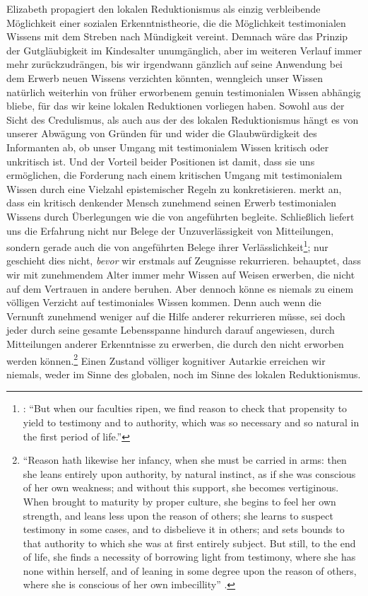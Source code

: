 Elizabeth  propagiert den lokalen Reduktionismus als einzig
verbleibende Möglichkeit einer sozialen Erkenntnistheorie, die die Möglichkeit
testimonialen Wissens mit dem Streben nach Mündigkeit vereint. Demnach wäre das
Prinzip der Gutgläubigkeit im Kindesalter unumgänglich, aber im weiteren Verlauf
immer mehr zurückzudrängen, bis wir irgendwann gänzlich auf seine Anwendung bei
dem Erwerb neuen Wissens verzichten könnten, wenngleich unser Wissen natürlich
weiterhin von früher erworbenem genuin testimonialen Wissen abhängig bliebe, für
das wir keine lokalen Reduktionen vorliegen haben. Sowohl aus der Sicht des
Credulismus, als auch aus der des lokalen Reduktionismus hängt es von unserer
Abwägung von Gründen für und wider die Glaubwürdigkeit des Informanten ab, ob
unser Umgang mit testimonialem Wissen kritisch oder unkritisch ist. Und der
Vorteil beider Positionen ist damit, dass sie uns ermöglichen, die Forderung
nach einem kritischen Umgang mit testimonialem Wissen durch eine Vielzahl
epistemischer Regeln zu konkretisieren.
 merkt an, dass ein kritisch denkender Mensch zunehmend
seinen Erwerb testimonialen Wissens durch Überlegungen wie die von
 angeführten begleite. Schließlich liefert uns die Erfahrung
nicht nur Belege der Unzuverlässigkeit von Mitteilungen, sondern gerade auch die
von  angeführten Belege ihrer
Verlässlichkeit\footnote{\cite[Vgl.][488]{Reid:EssaysontheIntellectualPowersofMan2002}:
\enquote{But when our faculties ripen, we find reason to check that propensity
to yield to testimony and to authority, which was so necessary and so natural in
the first period of life.}}; nur geschieht dies nicht, \emph{bevor} wir erstmals
auf Zeugnisse rekurrieren.
 behauptet, dass wir mit
zunehmendem Alter immer mehr Wissen auf Weisen erwerben, die nicht auf dem
Vertrauen in andere beruhen. Aber dennoch könne es niemals zu einem
völligen Verzicht auf testimoniales Wissen kommen. Denn auch wenn die Vernunft zunehmend
weniger auf die Hilfe anderer rekurrieren müsse, sei doch jeder durch seine
gesamte Lebensspanne hindurch darauf angewiesen, durch Mitteilungen anderer
Erkenntnisse zu erwerben, die durch den 
nicht erworben werden können.\footnote{\enquote{Reason hath likewise her
infancy, when she must be carried in arms: then she leans entirely upon
authority, by natural instinct, as if she was conscious of her own weakness; and
without this support, she becomes vertiginous. When brought to maturity by
proper culture, she begins to feel her own strength, and leans less upon the
reason of others; she learns to suspect testimony in some cases, and to
disbelieve it in others; and sets bounds to that authority to which she was at
first entirely subject. But still, to the end of life, she finds a necessity of
borrowing light from testimony, where she has none within herself, and of
leaning in some degree upon the reason of others, where she is conscious of her
own imbecillity}
\parencite[][195.15--25]{Reid:AnInquiryIntotheHumanMindonthePrinciplesofCommonSense1997}.}
Einen Zustand völliger kognitiver Autarkie erreichen wir niemals, weder im Sinne
des globalen, noch im Sinne des lokalen Reduktionismus.

